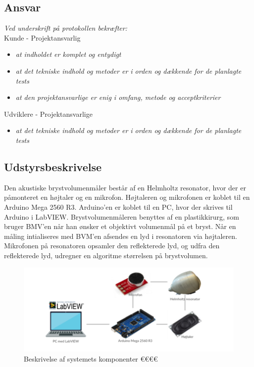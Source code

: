 		\subsection{Ansvar}
		\textit{		Ved underskrift på protokollen bekræfter: }\\
		
		Kunde - Projektansvarlig
		\begin{itemize}
			\item \textit{at indholdet er komplet og entydigt}
			\item \textit{at det tekniske indhold og metoder er i orden og dækkende for de planlagte tests}
			\item \textit{at den projektansvarlige er enig i omfang, metode og acceptkriterier}
		\end{itemize}
		
		Udviklere - Projektansvarlige
		\begin{itemize}
			\item \textit{at det tekniske indhold og metoder er i orden og dækkende for de planlagte tests}
		\end{itemize}
		
		\subsection{Udstyrsbeskrivelse}
		Den akustiske brystvolumenmåler består af en Helmholtz resonator, hvor der er påmonteret en højtaler og en mikrofon. Højtaleren og mikrofonen er koblet til en Arduino Mega 2560 R3. Arduino'en er koblet til en PC, hvor der skrives til Arduino i LabVIEW. 
		Brystvolumenmåleren benyttes af en plastikkirurg, som bruger BMV'en når han ønsker et objektivt volumenmål på et bryst. Når en måling intialiseres med BVM'en afsendes en lyd i resonatoren via højtaleren. Mikrofonen på resonatoren opsamler den reflekterede lyd, og udfra den reflekterede lyd, udregner en algoritme størrelsen på brystvolumen. 			
		\begin{figure}[htb]
			\centering
			\includegraphics[width=5in]{systembeskrivelse}
			\caption{Beskrivelse af systemets komponenter €€€€}
			\label{system}
		\end{figure}
		

